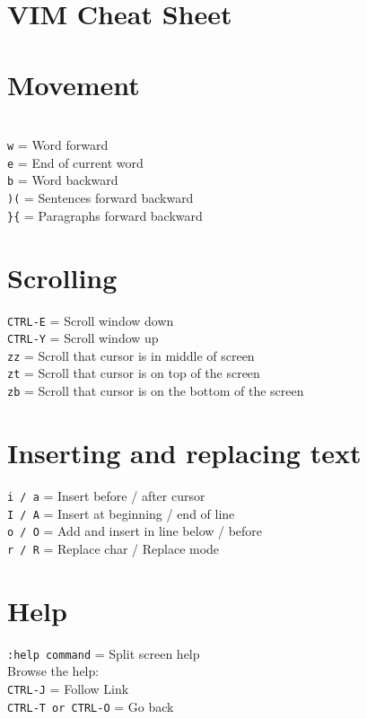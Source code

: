 \documentclass[10pt,DIV=50,landscape,pagesize,parskip=off]{scrartcl}
\newcommand\co[1]{\texttt{#1}}
\newcommand\coe[2]{\co{#1} = #2}
\begin{document}
\section*{{\Huge {}VIM Cheat Sheet}}
\begin{multicols}{3}
\section{Movement}
\\
\coe{w}{Word forward}\\
\coe{e}{End of current word}\\
\coe{b}{Word backward}\\
\coe{)(}{Sentences forward backward}\\
\coe{\}\{}{Paragraphs forward backward}

\section{Scrolling}
\coe{CTRL-E}{Scroll window down}\\
\coe{CTRL-Y}{Scroll window up}\\
\coe{zz}{Scroll that cursor is in middle of screen}\\
\coe{zt}{Scroll that cursor is on top of the screen}\\
\coe{zb}{Scroll that cursor is on the bottom of the screen}

\section{Inserting and replacing text}
\coe{i / a}{Insert before / after cursor}\\
\coe{I / A}{Insert at beginning / end of line}\\
\coe{o / O}{Add and insert in line below / before}\\
\coe{r / R}{Replace char / Replace mode}

\section{Help}
\coe{:help command}{Split screen help}\\
Browse the help:\\
\coe{CTRL-J}{Follow Link}\\
\coe{CTRL-T or CTRL-O}{Go back}


\end{multicols}
\end{document}
